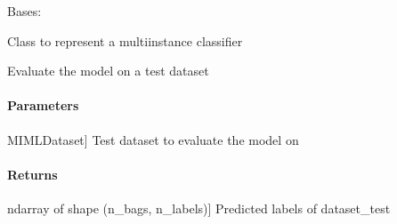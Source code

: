 \documentclass[letterpaper,10pt,english]{sphinxmanual}
\begin{document}
\begin{fulllineitems}
\label{\detokenize{classifier/mimlTOmi/_autosummary/miml.classifier.mimlTOmi.miml_to_mi_classifier.MIMLtoMIClassifier:miml.classifier.mimlTOmi.miml_to_mi_classifier.MIMLtoMIClassifier}}
\pysigstartsignatures
{}
\pysigstopsignatures
\sphinxAtStartPar
Bases: {\hyperref[\detokenize{classifier/_autosummary/miml.classifier.miml_classifier.MIMLClassifier:miml.classifier.miml_classifier.MIMLClassifier}]{}}

\sphinxAtStartPar
Class to represent a multi\sphinxhyphen{}instance classifier

\begin{fulllineitems}
\label{\detokenize{classifier/mimlTOmi/_autosummary/miml.classifier.mimlTOmi.miml_to_mi_classifier.MIMLtoMIClassifier:miml.classifier.mimlTOmi.miml_to_mi_classifier.MIMLtoMIClassifier.evaluate}}
\pysigstartsignatures
{}
\pysigstopsignatures
\sphinxAtStartPar
Evaluate the model on a test dataset


\paragraph{Parameters}
\label{\detokenize{classifier/mimlTOmi/_autosummary/miml.classifier.mimlTOmi.miml_to_mi_classifier.MIMLtoMIClassifier:parameters}}\begin{description}
\sphinxlineitem{dataset\_test}{[}MIMLDataset{]}
\sphinxAtStartPar
Test dataset to evaluate the model on

\end{description}


\paragraph{Returns}
\label{\detokenize{classifier/mimlTOmi/_autosummary/miml.classifier.mimlTOmi.miml_to_mi_classifier.MIMLtoMIClassifier:returns}}\begin{description}
\sphinxlineitem{results}{[}ndarray of shape (n\_bags, n\_labels){]}
\sphinxAtStartPar
Predicted labels of dataset\_test


\end{description}
\end{fulllineitems}
\end{fulllineitems}
\end{document}
